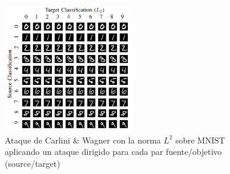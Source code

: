 \begin{figure}[h!]
    \centering
    \includegraphics[width=0.5\textwidth]{images/CW/CW_L2.png}
    \caption{Ataque de Carlini \& Wagner con la norma $L^2$ sobre MNIST aplicando un ataque dirigido para cada par fuente/objetivo (source/target)}
    \label{CW}
\end{figure}


